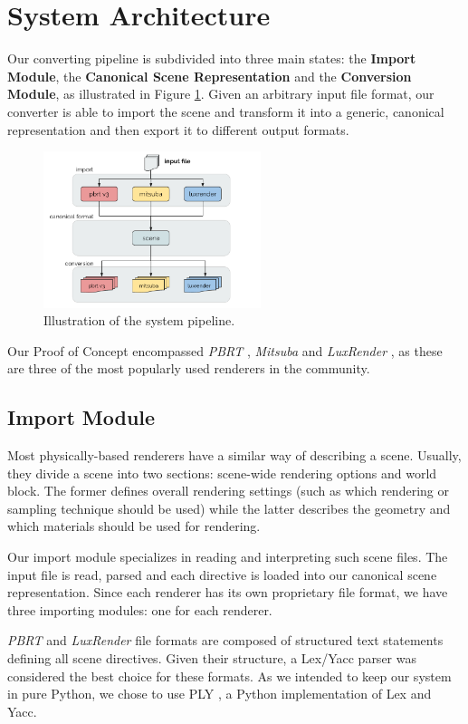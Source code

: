 \section{System Architecture}
Our converting pipeline is subdivided into three main states: the \textbf{Import 
Module}, the \textbf{Canonical Scene Representation} and the \textbf{Conversion 
Module}, as illustrated in Figure \ref{fig:sysarch}. Given an arbitrary input 
file format, our converter is able to import the scene and transform it into a 
generic, canonical representation and then export it to different output 
formats. 

\begin{figure}[h]
\centering
\includegraphics[width=2.5in]{figs/3_system_architecture/architecture.png}
\caption{Illustration of the system pipeline.}
\label{fig:sysarch}
\end{figure}

Our Proof of Concept encompassed \textit{PBRT} \cite{pbrt}, \textit{Mitsuba} 
\cite{mitsuba} and \textit{LuxRender} \cite{luxrender}, as these are three of 
the most popularly used renderers in the community.

\subsection{Import Module}
Most physically-based renderers have a similar way of describing a scene. 
Usually, they divide a scene into two sections: scene-wide rendering options and 
world block. The former defines overall rendering settings (such as which 
rendering or sampling technique should be used) while the latter describes the 
geometry and which materials should be used for rendering.

Our import module specializes in reading and interpreting such scene files. The 
input file is read, parsed and each directive is loaded into our canonical scene 
representation. Since each renderer has its own proprietary file format, we have 
three importing modules: one for each renderer.

\textit{PBRT} and \textit{LuxRender} file formats are composed of structured 
text statements defining all scene directives. Given their structure, a Lex/Yacc 
parser was considered the best choice for these formats. As we intended to keep 
our system in pure Python, we chose to use PLY \cite{ply}, a Python 
implementation of Lex and Yacc.

